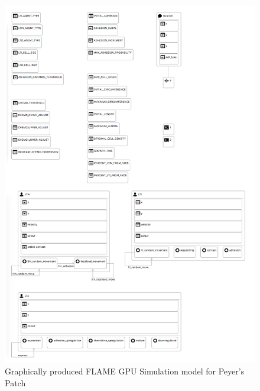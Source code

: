 \documentclass{UoYCSproject}
\begin{document}
\begin{figure}[htp]
\centering
\includegraphics[width=\textwidth]{Appendix/ppsim_gmf}
\caption{Graphically produced \gls{FLAME GPU} Simulation model for Peyer's Patch}
\label{fig:ppsim_gmf}
\end{figure}
 
\end{document}
